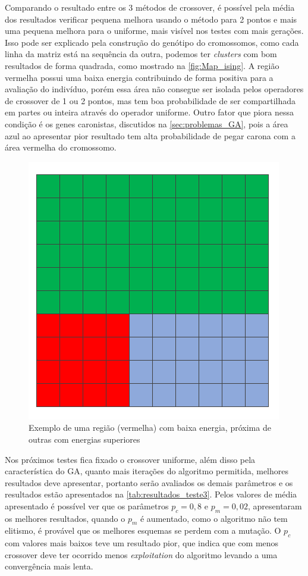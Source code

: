 Comparando o resultado entre os 3 métodos de crossover, é possível pela média dos resultados verificar pequena melhora usando o método para 2 pontos e mais uma pequena melhora para o uniforme, mais visível nos testes com mais gerações. Isso pode ser explicado pela construção do genótipo do cromossomos, como cada linha da matriz está na sequência da outra, podemos ter \textit{clusters} com bom resultados de forma quadrada, como mostrado na \autoref{fig:Map_ising}. A região vermelha possui uma baixa energia contribuindo de forma positiva para a avaliação do indivíduo, porém essa área não consegue ser isolada pelos operadores de crossover de 1 ou 2 pontos, mas tem boa probabilidade de ser compartilhada em partes ou inteira através do operador uniforme. Outro fator que piora nessa condição é os genes caronistas, discutidos na \autoref{sec:problemas_GA}, pois a área azul ao apresentar pior resultado tem alta probabilidade de pegar carona com a área vermelha do cromossomo.

\begin{figure}[h!]
	\centering
	\includegraphics[width=0.35\linewidth]{imagens/Mapa_ising.png}
	\caption{Exemplo de uma região (vermelha) com baixa energia, próxima de outras com energias superiores}
	\label{fig:Map_ising}
\end{figure}



Nos próximos testes fica fixado o crossover uniforme, além disso pela característica do GA, quanto mais iterações do algoritmo permitida, melhores resultados deve apresentar, portanto serão avaliados os demais parâmetros e os resultados estão apresentados na \autoref{tab:resultados_teste3}. Pelos valores de média apresentado é possível ver que os parâmetros \(p_c = 0,8\) e \(p_m = 0,02\), apresentaram os melhores resultados, quando o \(p_m\) é aumentado, como o algoritmo não tem elitismo, é provável que os melhores esquemas se perdem com a mutação. O \(p_c\) com valores mais baixos teve um resultado pior, que indica que com menos crossover deve ter ocorrido menos \textit{exploitation} do algoritmo levando a uma convergência mais lenta.

